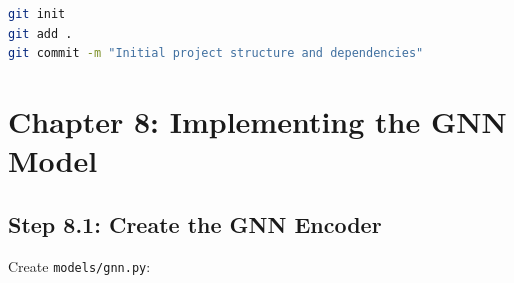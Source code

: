 \documentclass[12pt,a4paper]{article}
\begin{document}
\begin{gitcommit}
\begin{lstlisting}[language=bash]
git init
git add .
git commit -m "Initial project structure and dependencies"
\end{lstlisting}
\end{gitcommit}

\section{Chapter 8: Implementing the GNN Model}

\subsection{Step 8.1: Create the GNN Encoder}

Create \texttt{models/gnn.py}:
\end{document}

